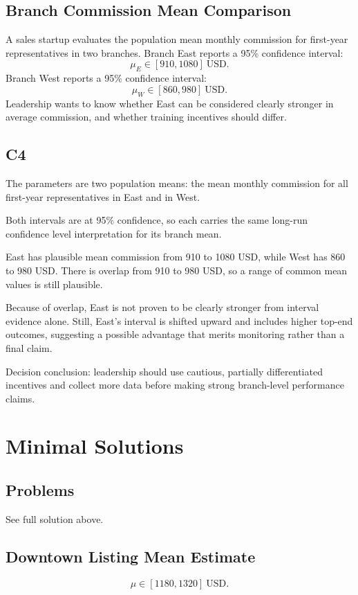\begin{ExamProblems}
		\section{Branch Commission Mean Comparison}
		A sales startup evaluates the population mean monthly commission for first-year representatives in two branches.
		Branch East reports a 95\% confidence interval:
		\[
		\mu_E \in [910, 1080]\ \text{USD}.
		\]
		Branch West reports a 95\% confidence interval:
		\[
		\mu_W \in [860, 980]\ \text{USD}.
		\]
		Leadership wants to know whether East can be considered clearly stronger in average commission, and whether training incentives should differ.

		\subsection*{C4}
		The parameters are two population means: the mean monthly commission for all first-year representatives in East and in West.

		Both intervals are at 95\% confidence, so each carries the same long-run confidence level interpretation for its branch mean.

		East has plausible mean commission from 910 to 1080 USD, while West has 860 to 980 USD.
		There is overlap from 910 to 980 USD, so a range of common mean values is still plausible.

		Because of overlap, East is not proven to be clearly stronger from interval evidence alone.
		Still, East's interval is shifted upward and includes higher top-end outcomes, suggesting a possible advantage that merits monitoring rather than a final claim.

		Decision conclusion: leadership should use cautious, partially differentiated incentives and collect more data before making strong branch-level performance claims.

	\end{ExamProblems}


\section{Minimal Solutions}

\subsection*{Problems}
See full solution above.

\subsection*{Downtown Listing Mean Estimate}
\[\mu \in [1180, 1320]\ \text{USD}.\]

